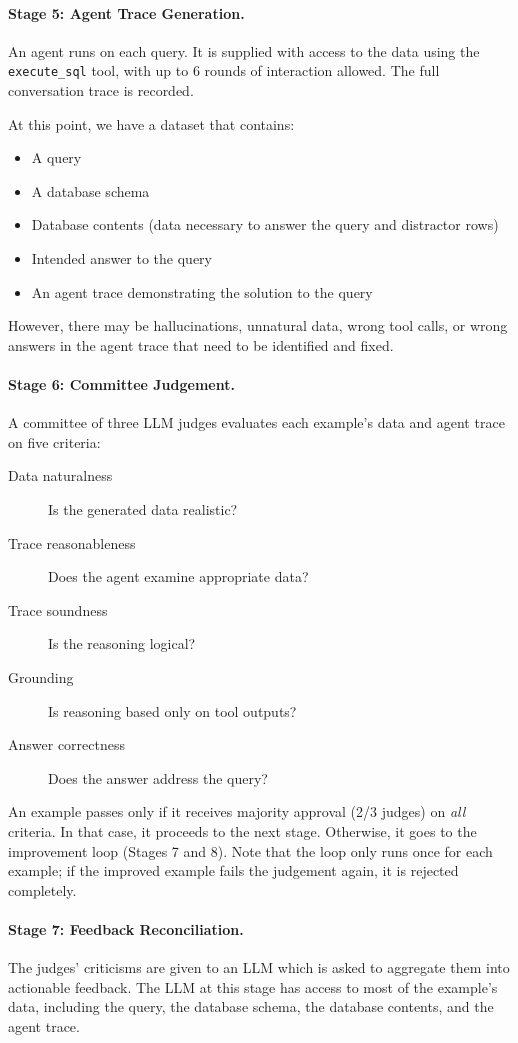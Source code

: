 \documentclass[11pt]{article}
\begin{document}
\paragraph{Stage 5: Agent Trace Generation.}
An agent runs on each query. It is supplied with access to the data using the \texttt{execute\_sql} tool, with up to 6 rounds of interaction allowed. The full conversation trace is recorded.

At this point, we have a dataset that contains:
\begin{itemize}
    \item A query
    \item A database schema
    \item Database contents (data necessary to answer the query and distractor rows)
    \item Intended answer to the query
    \item An agent trace demonstrating the solution to the query
\end{itemize}
However, there may be hallucinations, unnatural data, wrong tool calls, or wrong answers in the agent trace that need to be identified and fixed.

\paragraph{Stage 6: Committee Judgement.}
A committee of three LLM judges evaluates each example's data and agent trace on five criteria:
\begin{description}
    \item[Data naturalness] Is the generated data realistic?
    \item[Trace reasonableness] Does the agent examine appropriate data?
    \item[Trace soundness] Is the reasoning logical?
    \item[Grounding] Is reasoning based only on tool outputs?
    \item[Answer correctness] Does the answer address the query?
\end{description}

An example passes only if it receives majority approval (2/3 judges) on \emph{all} criteria. In that case, it proceeds to the next stage. Otherwise, it goes to the improvement loop (Stages 7 and 8). Note that the loop only runs once for each example; if the improved example fails the judgement again, it is rejected completely.

\paragraph{Stage 7: Feedback Reconciliation.}
The judges' criticisms are given to an LLM which is asked to aggregate them into actionable feedback. The LLM at this stage has access to most of the example's data, including the query, the database schema, the database contents, and the agent trace.
\end{document}
